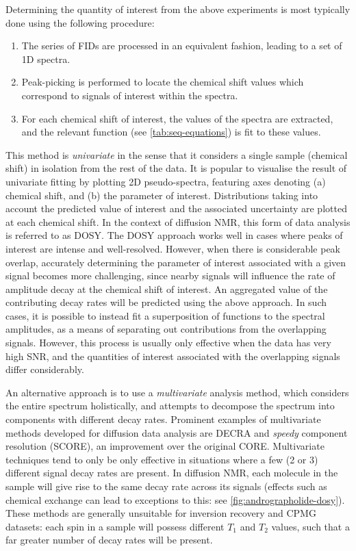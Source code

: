 Determining the quantity of interest from the above experiments is most
typically done using the following procedure:
\begin{enumerate}
    \item The series of \acp{FID} are processed in an equivalent fashion,
        leading to a set of \ac{1D} spectra.
    \item Peak-picking is performed to locate the chemical shift values which
        correspond to signals of interest within the spectra.
    \item For each chemical shift of interest, the values of the spectra are
        extracted, and the relevant function (see
        \cref{tab:seq-equations}) is fit to these values.
\end{enumerate}
This method is \emph{univariate} in the sense that it considers a single sample
(chemical shift) in isolation from the rest of the data.
It is popular to visualise the result of univariate fitting by plotting \ac{2D}
pseudo-spectra, featuring axes denoting (a) chemical shift, and (b)
the parameter of interest. Distributions taking
into account the predicted value of interest and the associated uncertainty
are plotted at each chemical shift.
In the context of diffusion \ac{NMR}, this form of data analysis is
referred to as \ac{DOSY}\cite{Morris2009b}.
The \ac{DOSY} approach works well in cases where peaks of interest are intense
and well-resolved. However, when there is considerable peak overlap, accurately
determining the parameter of interest associated with a given signal becomes
more challenging, since nearby signals will influence the rate of amplitude
decay at the chemical shift of interest. An aggregated value of the
contributing decay rates will be predicted using the above approach.
In such cases, it is possible to instead fit
a superposition of functions to the spectral amplitudes, as a means of
separating out contributions from the overlapping signals\cite{Nilsson2006}.
However, this process is usually only effective when the data has very high
\ac{SNR}, and the quantities of interest associated with the overlapping
signals differ considerably.

An alternative approach
is to use a \emph{multivariate} analysis method, which considers the entire
spectrum holistically, and attempts to decompose the spectrum into components
with different decay rates. Prominent examples of multivariate methods
developed for diffusion data analysis are \ac{DECRA}\cite{Windig1998} and
\emph{speedy} component resolution (\acs{SCORE})\cite{Nilsson2008}, an
improvement over the original \acs{CORE}\cite{Stilbs1996,Stilbs1996b}.
Multivariate techniques tend to only be only effective in situations where a
few (2 or 3) different signal decay rates are present. In diffusion
\ac{NMR}, each molecule in the sample will give rise to the same decay rate
across its signals (effects such as chemical exchange can lead to exceptions to
this: see \cref{fig:andrographolide-dosy}).
These methods are generally unsuitable for inversion recovery and \ac{CPMG} datasets:
each spin in a sample will possess different $T_1$ and $T_2$ values, such that
a far greater number of decay rates will be present.

